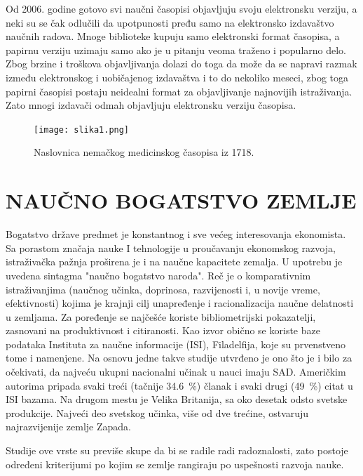 \documentclass[12pt,a4paper]{article}
\begin{document}
   Od 2006. godine gotovo svi naučni časopisi objavljuju svoju elektronsku verziju, a neki su se čak odlučili da upotpunosti pređu samo na elektronsko izdavaštvo naučnih radova. Mnoge biblioteke kupuju samo elektronski format časopisa, a papirnu verziju uzimaju samo ako je u pitanju veoma traženo i popularno delo. Zbog brzine i troškova objavljivanja dolazi do toga da može da se napravi razmak između elektronskog i uobičajenog izdavaštva i to do nekoliko meseci, zbog toga papirni časopisi postaju neidealni format za objavljivanje najnovijih istraživanja. Zato mnogi izdavači odmah objavljuju elektronsku verziju časopisa.

\begin{figure} [h]
\centering  
\texttt{[image: slika1.png]} 
\caption{ Naslovnica nemačkog medicinskog časopisa iz 1718.}\label{slika1}
\end{figure}  
\newpage

\section{\large\textbf{NAUČNO BOGATSTVO ZEMLJE}}
\indent 

    Bogatstvo države predmet je konstantnog i sve većeg interesovanja ekonomista. Sa porastom značaja nauke I tehnologije u proučavanju ekonomskog razvoja, istraživačka pažnja proširena je i na naučne kapacitete zemalja. U upotrebu je uvedena sintagma "naučno bogatstvo naroda". Reč je o komparativnim istraživanjima (naučnog učinka, doprinosa, razvijenosti i, u novije vreme, efektivnosti) kojima je krajnji cilj unapređenje i racionalizacija naučne delatnosti u zemljama. Za poređenje se najčešće koriste bibliometrijski pokazatelji, zasnovani na produktivnost i citiranosti. Kao izvor obično se koriste baze podataka Instituta za naučne informacije (ISI), Filadelfija, koje su prvenstveno tome i namenjene. Na osnovu jedne takve studije utvrđeno je ono što je i bilo za očekivati, da najveću ukupni nacionalni učinak u nauci imaju SAD. Američkim autorima pripada svaki treći (tačnije \SI{34.6}{\percent}) članak i svaki drugi (\SI{49}{\percent}) citat u ISI bazama. Na drugom mestu je Velika Britanija, sa oko desetak odsto svetske produkcije. Najveći deo svetskog učinka, više od dve trećine, ostvaruju najrazvijenije zemlje Zapada.
  
   Studije ove vrste su previše skupe da bi se radile radi radoznalosti, zato postoje određeni kriterijumi po kojim se zemlje rangiraju po uspešnosti razvoja nauke.
   
\end{document}
